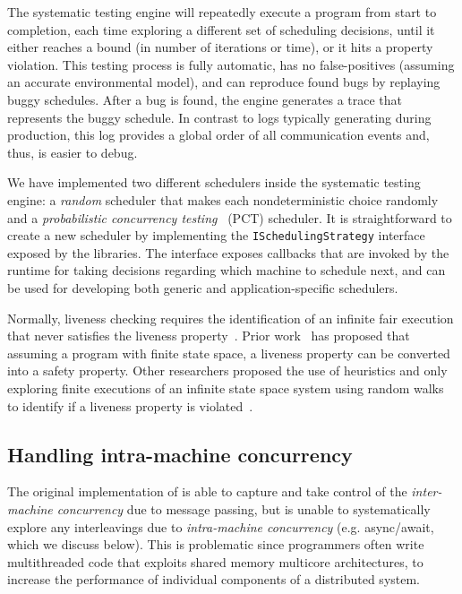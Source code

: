 The \psharp systematic testing engine will repeatedly execute a program from start to completion, each time exploring a different set of scheduling decisions, until it either reaches a bound (in number of iterations or time), or it hits a property violation. This testing process is fully automatic, has no false-positives (assuming an accurate environmental model), and can reproduce found bugs by replaying buggy schedules. After a bug is found, the engine generates a trace that represents the buggy schedule. In contrast to logs typically generating during production, this log provides a global order of all communication events and, thus, is easier to debug.

We have implemented two different schedulers inside the \psharp systematic testing engine: a \emph{random} scheduler that makes each nondeterministic choice randomly and a \emph{probabilistic concurrency testing}~\cite{burckhardt2010pct} (PCT) scheduler. It is straightforward to create a new scheduler by implementing the \texttt{ISchedulingStrategy} interface~\cite{desai2015systematic} exposed by the \psharp libraries. The interface exposes callbacks that are invoked by the \psharp runtime for taking decisions regarding which machine to schedule next, and can be used for developing both generic and application-specific schedulers.

Normally, liveness checking requires the identification of an infinite fair execution that never satisfies the liveness property~\cite{schuppan2004efficient, musuvathi2008fair}. Prior work~\cite{schuppan2004efficient} has proposed that assuming a program with finite state space, a liveness property can be converted into a safety property. Other researchers proposed the use of heuristics and only exploring finite executions of an infinite state space system using random walks to identify if a liveness property is violated~\cite{killian2007life}.

\subsection{Handling intra-machine concurrency}
\label{sec:psharp:async}

The original implementation of \psharp is able to capture and take control of the \emph{inter-machine concurrency} due to message passing, but is unable to systematically explore any interleavings due to \emph{intra-machine concurrency} (e.g. async/await, which we discuss below). This is problematic since programmers often write multithreaded code that exploits shared memory multicore architectures, to increase the performance of individual components of a distributed system.

